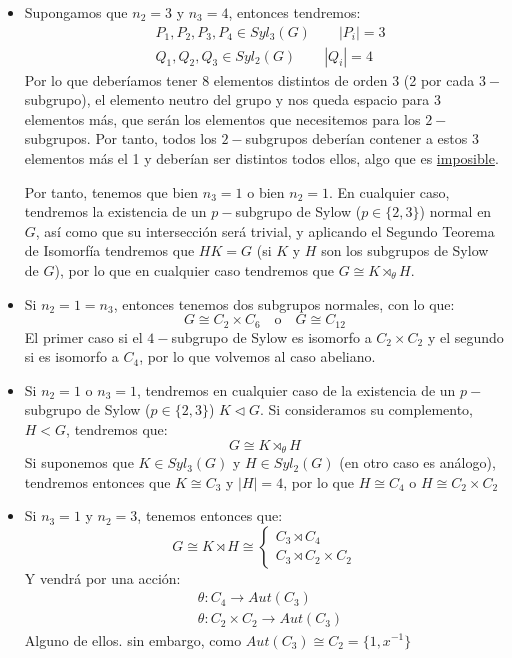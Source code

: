 \begin{itemize}
    \item Supongamos que $n_2 = 3$ y $n_3 = 4$, entonces tendremos:
        \begin{align*}
            &P_1,P_2,P_3,P_4 \in Syl_3(G) \qquad |P_i| = 3 \\
            &Q_1,Q_2,Q_3 \in Syl_2(G) \qquad |Q_i| = 4
        \end{align*}
        Por lo que deberíamos tener $8$ elementos distintos de orden 3 (2 por cada $3-$subgrupo), el elemento neutro del grupo y nos queda espacio para 3 elementos más, que serán los elementos que necesitemos para los $2-$subgrupos. Por tanto, todos los $2-$subgrupos deberían contener a estos 3 elementos más el 1 y deberían ser distintos todos ellos, algo que es \underline{imposible}.

        Por tanto, tenemos que bien $n_3 = 1$ o bien $n_2 = 1$. En cualquier caso, tendremos la existencia de un $p-$subgrupo de Sylow ($p\in \{2,3\}$) normal en $G$, así como que su intersección será trivial, y aplicando el Segundo Teorema de Isomorfía tendremos que $HK = G$ (si $K$ y $H$ son los subgrupos de Sylow de $G$), por lo que en cualquier caso tendremos que $G \cong K\rtimes_\theta H$.
    \item Si $n_2 = 1 = n_3$, entonces tenemos dos subgrupos normales, con lo que:
        \begin{equation*}
            G\cong C_2\times C_6 \quad \text{o} \quad G\cong C_{12}
        \end{equation*}
        El primer caso si el $4-$subgrupo de Sylow es isomorfo a $C_2\times C_2$ y el segundo si es isomorfo a $C_4$, por lo que volvemos al caso abeliano.
    \item Si $n_2 = 1$ o $n_3 = 1$, tendremos en cualquier caso de la existencia de un $p-$subgrupo de Sylow ($p\in \{2,3\}$) $K\lhd G$. Si consideramos su complemento, $H<G$, tendremos que:
        \begin{equation*}
            G\cong K\rtimes_\theta H
        \end{equation*}
        Si suponemos que $K\in Syl_3(G)$ y $H\in Syl_2(G)$ (en otro caso es análogo), tendremos entonces que $K\cong C_3$ y $|H| = 4$, por lo que $H \cong C_4$ o $H\cong C_2\times C_2$
    \item Si $n_3 = 1$ y $n_2 = 3$, tenemos entonces que:
        \begin{equation*}
            G\cong K\rtimes H \cong \left\{\begin{array}{l}
                C_3\rtimes C_4 \\
                C_3 \rtimes C_2 \times C_2
            \end{array}\right.
        \end{equation*}
        Y vendrá por una acción:
        \begin{align*}
            &\theta:C_4 \to Aut(C_3) \\
            &\theta:C_2\times C_2 \to Aut(C_3)
        \end{align*}
        Alguno de ellos. sin embargo, como $Aut(C_3)\cong C_2 = \{1,x^{-1}\}$


\end{itemize}
